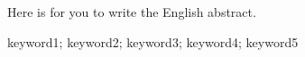 
\eAbstract
{
Here is for you to write the English abstract.



}
{keyword1; keyword2; keyword3; keyword4; keyword5}
